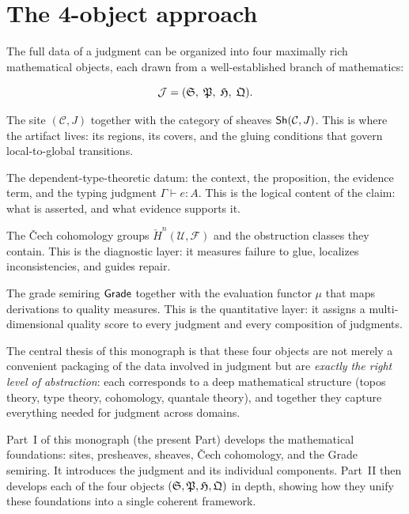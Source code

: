 \section{The 4-object approach}
\label{sec:intro:4objects}

The full data of a judgment can be organized into four maximally rich
mathematical objects, each drawn from a well-established branch of
mathematics:

\[
\mathcal{J} = (\mathfrak{S},\; \mathfrak{P},\; \mathfrak{H},\; \mathfrak{Q}).
\]

\begin{description}[leftmargin=2.5em]
\item[$\STop$ --- the Semantic Topos.]
  The site $(\mathcal{C}, J)$ together with the category of sheaves
  $\mathsf{Sh}(\mathcal{C}, J)$.  This is where the artifact lives: its
  regions, its covers, and the gluing conditions that govern
  local-to-global transitions.

\item[$\PStr$ --- the Proof Structure.]
  The dependent-type-theoretic datum: the context, the proposition,
  the evidence term, and the typing judgment $\Gamma \vdash e : A$.
  This is the logical content of the claim: what is asserted, and what
  evidence supports it.

\item[$\CSpec$ --- the Cohomological Spectrum.]
  The \v{C}ech cohomology groups $\check{H}^n(\mathcal{U},
  \mathcal{F})$ and the obstruction classes they contain.  This is the
  diagnostic layer: it measures failure to glue, localizes
  inconsistencies, and guides repair.

\item[$\GEval$ --- the Graded Evaluation.]
  The grade semiring $\mathsf{Grade}$ together with the evaluation functor
  $\mu$ that maps derivations to quality measures.  This is the
  quantitative layer: it assigns a multi-dimensional quality score to
  every judgment and every composition of judgments.
\end{description}

The central thesis of this monograph is that these four objects are
not merely a convenient packaging of the data involved in judgment
but are \emph{exactly the right level of abstraction}: each
corresponds to a deep mathematical structure (topos theory,
type theory, cohomology, quantale theory), and together they
capture everything needed for judgment across domains.

Part~I of this monograph (the present Part) develops the mathematical
foundations: sites, presheaves, sheaves, \v{C}ech cohomology, and the
Grade semiring.  It introduces the judgment and its individual
components.  Part~II then develops each of the four objects
$(\mathfrak{S}, \mathfrak{P}, \mathfrak{H}, \mathfrak{Q})$ in depth, showing how they unify
these foundations into a single coherent framework.


